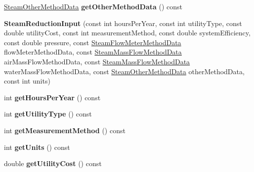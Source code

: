 \begin{DoxyCompactItemize}
\item 
\mbox{\label{class_steam_reduction_input_a0975aab8faf50599028f150c184c9699}} 
\hyperlink{class_steam_other_method_data}{Steam\+Other\+Method\+Data} {\bfseries get\+Other\+Method\+Data} () const
\item 
\mbox{\label{class_steam_reduction_input_a1e5233ae23531bfd3573f1dbcec7e3f1}} 
{\bfseries Steam\+Reduction\+Input} (const int hours\+Per\+Year, const int utility\+Type, const double utility\+Cost, const int measurement\+Method, const double system\+Efficiency, const double pressure, const \hyperlink{class_steam_flow_meter_method_data}{Steam\+Flow\+Meter\+Method\+Data} flow\+Meter\+Method\+Data, const \hyperlink{class_steam_mass_flow_method_data}{Steam\+Mass\+Flow\+Method\+Data} air\+Mass\+Flow\+Method\+Data, const \hyperlink{class_steam_mass_flow_method_data}{Steam\+Mass\+Flow\+Method\+Data} water\+Mass\+Flow\+Method\+Data, const \hyperlink{class_steam_other_method_data}{Steam\+Other\+Method\+Data} other\+Method\+Data, const int units)
\item 
\mbox{\label{class_steam_reduction_input_a7640e0fd2d492f225d1acc970b563d54}} 
int {\bfseries get\+Hours\+Per\+Year} () const
\item 
\mbox{\label{class_steam_reduction_input_ad60f231e29fccf4bdf6821a5adcb1adb}} 
int {\bfseries get\+Utility\+Type} () const
\item 
\mbox{\label{class_steam_reduction_input_a8e6f464d743dfe1de41b1a00f4d29636}} 
int {\bfseries get\+Measurement\+Method} () const
\item 
\mbox{\label{class_steam_reduction_input_a3826819793f0f3f71743eb095df22497}} 
int {\bfseries get\+Units} () const
\item 
\mbox{\label{class_steam_reduction_input_a758bacf2e76372745affad9acffd9129}} 
double {\bfseries get\+Utility\+Cost} () const
\item 
\mbox{\label{class_steam_reduction_input_a818bc57bd61a00a4991d7929045d826a}} 

\end{DoxyCompactItemize}
